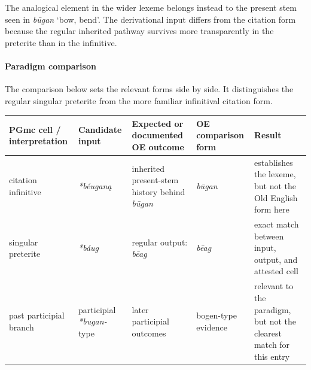 \documentclass[
  british,
  a4paper,
]{article}
\newcounter{none} %
\begin{document}
The analogical element in the wider lexeme belongs instead to the
present stem seen in {\emph{būgan}} `bow, bend'. The derivational input
differs from the citation form because the regular inherited pathway
survives more transparently in the preterite than in the infinitive.

\paragraph{Paradigm comparison}\label{paradigm-comparison-5}

The comparison below sets the relevant forms side by side. It
distinguishes the regular singular preterite from the more familiar
infinitival citation form.

{\def\LTcaptype{none} %
\begin{longtable}[]{@{}
  >{\raggedright\arraybackslash}p{}
  >{\raggedright\arraybackslash}p{}
  >{\raggedright\arraybackslash}p{}
  >{\raggedright\arraybackslash}p{}
  >{\raggedright\arraybackslash}p{}@{}}
\toprule\noalign{}
\begin{minipage}[b]{\linewidth}\raggedright
PGmc cell / interpretation
\end{minipage} & \begin{minipage}[b]{\linewidth}\raggedright
Candidate input
\end{minipage} & \begin{minipage}[b]{\linewidth}\raggedright
Expected or documented OE outcome
\end{minipage} & \begin{minipage}[b]{\linewidth}\raggedright
OE comparison form
\end{minipage} & \begin{minipage}[b]{\linewidth}\raggedright
Result
\end{minipage} \\
\midrule\noalign{}
\endhead
\bottomrule\noalign{}
\endlastfoot
citation infinitive & {\emph{*béuganą}} & inherited present-stem history
behind {\emph{būgan}} & {\emph{būgan}} & establishes the lexeme, but not
the Old English form here \\
singular preterite & {\emph{*báug}} & regular output: {\emph{bēag}} &
{\emph{bēag}} & exact match between input, output, and attested cell \\
past participial branch & participial \emph{*bugan-} type & later
participial outcomes & bogen-type evidence & relevant to the paradigm,
but not the clearest match for this entry \\
\end{longtable}
}
\end{document}
